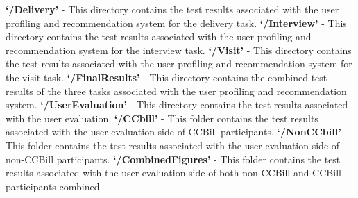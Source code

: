 \documentclass{aifyp}
\begin{document}
\begin{appendices}
\newline
\textbf{`/Delivery'} - This directory contains the test results associated with the user profiling and recommendation system for the delivery task.
\newline
\newline
\textbf{`/Interview'} - This directory contains the test results associated with the user profiling and recommendation system for the interview task.
\newline
\newline
\textbf{`/Visit'} - This directory contains the test results associated with the user profiling and recommendation system for the visit task.
\newline
\newline
\textbf{`/FinalResults'} - This directory contains the combined test results of the three tasks associated with the user profiling and recommendation system.
\newline
\newline
\textbf{`/UserEvaluation'} - This directory contains the test results associated with the user evaluation.
\newline
\newline
\textbf{`/CCbill'} - This folder contains the test results associated with the user evaluation side of CCBill participants.
\newline
\newline
\textbf{`/NonCCbill'} - This folder contains the test results associated with the user evaluation side of non-CCBill participants.
\newline
\newline
\textbf{`/CombinedFigures'} - This folder contains the test results associated with the user evaluation side of both non-CCBill and CCBill participants combined.
\end{appendices}
\end{document}
